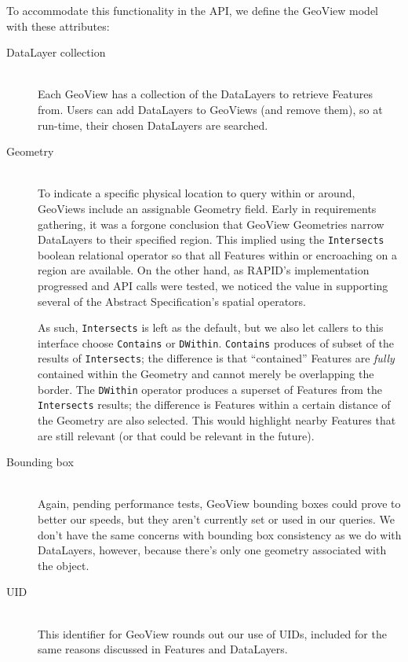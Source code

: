 To accommodate this functionality in the API, we define the GeoView model with these attributes:

\begin{description}

\item[DataLayer collection] \hfill \\
Each GeoView has a collection of the DataLayers to retrieve Features from. Users can add DataLayers to GeoViews (and remove them), so at run-time, their chosen DataLayers are searched.

\item[Geometry] \hfill \\
To indicate a specific physical location to query within or around, GeoViews include an assignable Geometry field. Early in requirements gathering, it was a forgone conclusion that GeoView Geometries narrow DataLayers to their specified region. This implied using the \texttt{Intersects} boolean relational operator so that all Features within or encroaching on a region are available. On the other hand, as RAPID's implementation progressed and API calls were tested, we noticed the value in supporting several of the Abstract Specification's spatial operators.

As such, \texttt{Intersects} is left as the default, but we also let callers to this interface choose \texttt{Contains} or \texttt{DWithin}. \texttt{Contains} produces of subset of the results of \texttt{Intersects}; the difference is that ``contained'' Features are \textit{fully} contained within the Geometry and cannot merely be overlapping the border. The \texttt{DWithin} operator produces a superset of Features from the \texttt{Intersects} results; the difference is Features within a certain distance of the Geometry are also selected. This would highlight nearby Features that are still relevant (or that could be relevant in the future).

\item[Bounding box] \hfill \\
Again, pending performance tests, GeoView bounding boxes could prove to better our speeds, but they aren't currently set or used in our queries. We don't have the same concerns with bounding box consistency as we do with DataLayers, however, because there's only one geometry associated with the object.

\item[UID] \hfill \\
This identifier for GeoView rounds out our use of UIDs, included for the same reasons discussed in Features and DataLayers.


\end{description}
